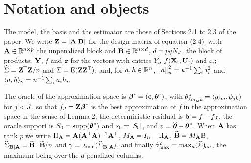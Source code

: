 \section{Notation and objects}

The model, the basis and the estimator are those of Sections 2.1 to 2.3 of the
paper. We write $\mathbf{Z} = [\mathbf{A}\;\mathbf{B}]$ for the design matrix of equation
(2.4), with $\mathbf{A} \in \mathbb{R}^{n\times p}$ the unpenalized block and
$\mathbf{B} \in \mathbb{R}^{n\times d}$, $d = pqN_{J}$, the block of products; $\mathbf{Y}$, $f$ and
$\boldsymbol{\varepsilon}$ for the vectors with entries $Y_i$, $f(\mathbf{X}_i,\mathbf{U}_i)$ and
$\varepsilon_i$; $\widehat{\Sigma} = \mathbf{Z}^{\top}\mathbf{Z}/n$ and $\Sigma = \mathrm{E}(\mathbf{Z}\mathbf{Z}^{\top})$; and, for
$a, h \in \mathbb{R}^n$, $\left\lVert a \right\rVert_{n}^2 = n^{-1}\sum_i a_i^2$ and
$\langle a, h \rangle_n = n^{-1}\sum_i a_ih_i$.

The oracle of the approximation space is $\boldsymbol{\beta}^{*} = (\mathbf{c},\boldsymbol{\theta}^{*})$, with
$\theta^{*}_{\ell m,jk} = \langle g_{\ell m}, \psi_{jk} \rangle$
for $j < J$, so that $f_J = \mathbf{Z}\boldsymbol{\beta}^{*}$ is the best approximation of $f$
in the approximation space in the sense of Lemma 2; the deterministic residual is
$\mathbf{b} = f - f_J$, the oracle support is $S_{0} = \operatorname{supp}(\boldsymbol{\theta}^{*})$ and
$s_0 = |S_{0}|$, and $v = \widehat{\boldsymbol{\theta}} - \boldsymbol{\theta}^{*}$. When $\mathbf{A}$ has rank $p$
we write $\Pi_{\mathbf{A}} = \mathbf{A}(\mathbf{A}^{\top}\mathbf{A})^{-1}\mathbf{A}^{\top}$, $M_{\mathbf{A}} = I_n - \Pi_{\mathbf{A}}$,
$\widetilde{\mathbf{B}} = M_{\mathbf{A}}\mathbf{B}$, $\widehat{\Sigma}_{\mathbf{B}\mid\mathbf{A}} = \widetilde{\mathbf{B}}^{\top}\widetilde{\mathbf{B}}/n$ and $\widetilde{\gamma} = \lambda_{\min}(\widehat{\Sigma}_{\mathbf{B}\mid\mathbf{A}})$, and
finally $\widehat{\sigma}_{\max}^2 = \max_a(\widehat{\Sigma})_{aa}$, the maximum being over the $d$
penalized columns.


